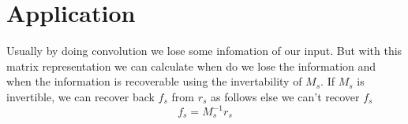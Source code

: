 \documentclass[a4paper,landscape]{article}
\begin{document}
\section{Application}
Usually by doing convolution we lose some infomation of our input. But  with  this matrix representation we can calculate when do we lose the information and when the information is recoverable using the invertability of $M_s$. If $M_s$ is invertible, we can recover back $f_s$ from $r_s$ as follows else we can't recover $f_s$
\[f_s=M_s^{-1}r_s\]
\end{document}
